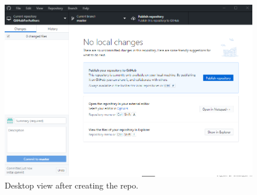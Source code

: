 \documentclass[a4paper, 12pt]{article}
\begin{document}
\begin{figure}
\centering
\includegraphics[width=\linewidth]{NewRepoFirstView}
\caption{Desktop view after creating the repo.}
\label{repofirstview}
\end{figure}
\end{document}
